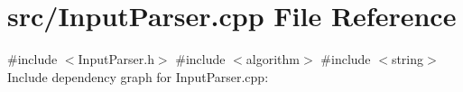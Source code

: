\section{src/\+Input\+Parser.cpp File Reference}
\label{_input_parser_8cpp}
{\ttfamily \#include $<$Input\+Parser.\+h$>$}\newline
{\ttfamily \#include $<$algorithm$>$}\newline
{\ttfamily \#include $<$string$>$}\newline
Include dependency graph for Input\+Parser.\+cpp\+:

